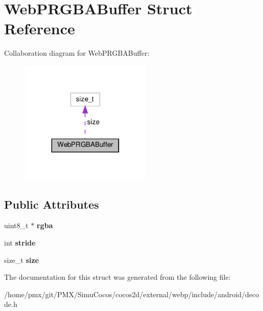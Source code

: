 \hypertarget{structWebPRGBABuffer}{}\section{Web\+P\+R\+G\+B\+A\+Buffer Struct Reference}
\label{structWebPRGBABuffer}


Collaboration diagram for Web\+P\+R\+G\+B\+A\+Buffer\+:
\nopagebreak
\begin{figure}[H]
\begin{center}
\leavevmode
\includegraphics[width=178pt]{structWebPRGBABuffer__coll__graph}
\end{center}
\end{figure}
\subsection*{Public Attributes}
\begin{DoxyCompactItemize}
\item 
\mbox{\label{structWebPRGBABuffer_a8c81feee2bc1a6ed9daaeb6fba999e13}} 
uint8\+\_\+t $\ast$ {\bfseries rgba}
\item 
\mbox{\label{structWebPRGBABuffer_a571fb2a14b6c081aff2076e6e903b874}} 
int {\bfseries stride}
\item 
\mbox{\label{structWebPRGBABuffer_a19f883a851a95c2378295e4977f58ae6}} 
size\+\_\+t {\bfseries size}
\end{DoxyCompactItemize}


The documentation for this struct was generated from the following file\+:\begin{DoxyCompactItemize}
\item 
/home/pmx/git/\+P\+M\+X/\+Simu\+Cocos/cocos2d/external/webp/include/android/decode.\+h\end{DoxyCompactItemize}
